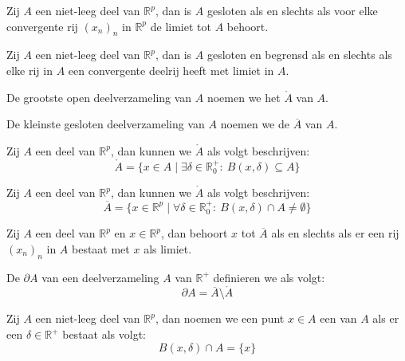 \documentclass[main.tex]{subfiles}
\begin{document}
\begin{pr}
  Zij $A$ een niet-leeg deel van $\mathbb{R}^{p}$, dan is $A$ gesloten als en slechts als voor elke convergente rij $(x_{n})_{n}$ in $\mathbb{R}^{p}$ de limiet tot $A$ behoort.
\end{pr}

\begin{st}
  \label{st:in-rp-gesloten-en-begrensd-itv-rijen}
  Zij $A$ een niet-leeg deel van $\mathbb{R}^{p}$, dan is $A$ gesloten en begrensd als en slechts als elke rij in $A$ een convergente deelrij heeft met limiet in $A$.
\end{st}

\begin{de}
  De grootste open deelverzameling van $A$ noemen we het  $\mathring{A}$ van $A$.
\end{de}

\begin{de}
  De kleinste gesloten deelverzameling van $A$ noemen we de  $\overline{A}$ van $A$.
\end{de}

\begin{pr}
  Zij $A$ een deel van $\mathbb{R}^{p}$, dan kunnen we $\mathring{A}$ als volgt beschrijven:
  \[ \mathring{A} = \{ x \in A \mid \exists \delta \in \mathbb{R}_{0}^{+}:\ B(x,\delta) \subseteq A \} \]
\end{pr}

\begin{pr}
  Zij $A$ een deel van $\mathbb{R}^{p}$, dan kunnen we $\mathring{A}$ als volgt beschrijven:
  \[ \overline{A} = \{ x \in \mathbb{R}^{p} \mid \forall \delta \in \mathbb{R}_{0}^{+}:\ B(x,\delta) \cap A \neq \emptyset \} \]
\end{pr}

\begin{pr}
  Zij $A$ een deel van $\mathbb{R}^{p}$ en $x\in \mathbb{R}^{p}$, dan behoort $x$ tot $\overline{A}$ als en slechts als er een rij $(x_{n})_{n}$ in $A$ bestaat met $x$ als limiet.
\end{pr}

\begin{de}
  De  $\partial A$ van een deelverzameling $A$ van $\mathbb{R}^{+}$ definieren we als volgt:
  \[ \partial A = \overline{A} \setminus \mathring{A} \]
\end{de}

\begin{de}
  Zij $A$ een niet-leeg deel van $\mathbb{R}^{p}$, dan noemen we een punt $x\in A$ een  van $A$ als er een $\delta \in \mathbb{R}^{+}$ bestaat als volgt:
  \[ B(x,\delta) \cap A = \{x\} \]
\end{de}
\end{document}
